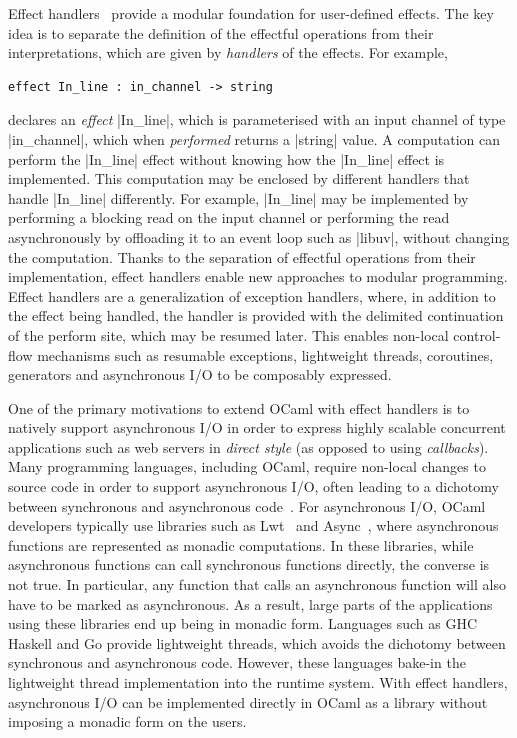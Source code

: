 \documentclass[sigplan,screen]{acmart}
\begin{document}
Effect handlers~\cite{Plotkin09} provide a modular foundation for user-defined
effects. The key idea is to separate the definition of the effectful operations
from their interpretations, which are given by \emph{handlers} of the effects.
For example,
%
\begin{lstlisting}
effect In_line : in_channel -> string
\end{lstlisting}
%
declares an \emph{effect} |In_line|, which is parameterised with an input
channel of type |in_channel|, which when \emph{performed} returns a |string|
value. A computation can perform the |In_line| effect without knowing how the
|In_line| effect is implemented. This computation may be enclosed by different
handlers that handle |In_line| differently. For example, |In_line| may be
implemented by performing a blocking read on the input channel or performing
the read asynchronously by offloading it to an event loop such as |libuv|,
without changing the computation. Thanks to the separation of effectful
operations from their implementation, effect handlers enable new approaches to
modular programming. Effect handlers are a generalization of exception
handlers, where, in addition to the effect being handled, the handler is
provided with the delimited continuation~\cite{Danvy90} of the perform site,
which may be resumed later. This enables non-local control-flow mechanisms such
as resumable exceptions, lightweight threads, coroutines, generators and
asynchronous I/O to be composably expressed.

One of the primary motivations to extend OCaml with effect handlers is to
natively support asynchronous I/O in order to express highly scalable
concurrent applications such as web servers in \emph{direct style} (as opposed
to using \emph{callbacks}). Many programming languages, including OCaml,
require non-local changes to source code in order to support asynchronous I/O,
often leading to a dichotomy between synchronous and asynchronous
code~\cite{colour}. For asynchronous I/O, OCaml developers typically use
libraries such as Lwt~\cite{lwt} and Async~\cite[\S18]{rwo}, where asynchronous
functions are represented as monadic computations. In these libraries, while
asynchronous functions can call synchronous functions directly, the converse is
not true. In particular, any function that calls an asynchronous function will
also have to be marked as asynchronous. As a result, large parts of the
applications using these libraries end up being in monadic form. Languages such
as GHC Haskell and Go provide lightweight threads, which avoids the dichotomy
between synchronous and asynchronous code. However, these languages bake-in the
lightweight thread implementation into the runtime system. With effect
handlers, asynchronous I/O can be implemented directly in OCaml as a library
without imposing a monadic form on the users.
\end{document}
